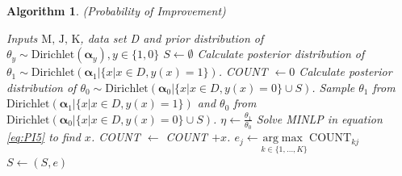 \documentclass[opre,nonblindrev]{informs3} %
\newtheorem{Algorithm}{Algorithm}
\begin{document}
\begin{Algorithm}(Probability of Improvement) \label{algo1}
\begin{algorithmic}[1]
\REQUIRE Inputs $\text{M, J, K}$, data set D and prior distribution of $\theta_y \sim \text{Dirichlet} (\boldsymbol \alpha_y), y \in \{1,0\}$
\STATE $S \leftarrow \emptyset $
\STATE Calculate posterior distribution of $\theta_1 \sim \text{Dirichlet} (\boldsymbol \alpha_1|\{x|x \in D,y(x)=1\})$.
\STATE COUNT $\leftarrow 0$
\STATE Calculate posterior distribution of $\theta_0 \sim \text{Dirichlet} (\boldsymbol \alpha_0|\{x|x \in D,y(x)=0\} \cup S)$.
\LOOP 
\STATE Sample $\theta_1$ from $\text{Dirichlet} (\boldsymbol \alpha_1|\{x|x \in D,y(x)=1\})$ and $\theta_0$ from $\text{Dirichlet} (\boldsymbol \alpha_0|\{x|x \in D,y(x)=0\} \cup S)$.
\STATE $\eta \leftarrow \frac{\theta_1}{\theta_0}$
\STATE Solve MINLP in equation \eqref{eq:PI5} to find $x$.
\STATE COUNT $\leftarrow$ COUNT $+ x$.
\ENDLOOP
{}
\STATE $e_j \leftarrow \underset{k \in \{1,\ldots,K\}}{\mathrm{arg}\max} \, \text{COUNT}_{kj}$
\ENDFOR
\STATE $S \leftarrow (S, e)$
\ENDFOR
\end{algorithmic}
\end{Algorithm}
\end{document}
